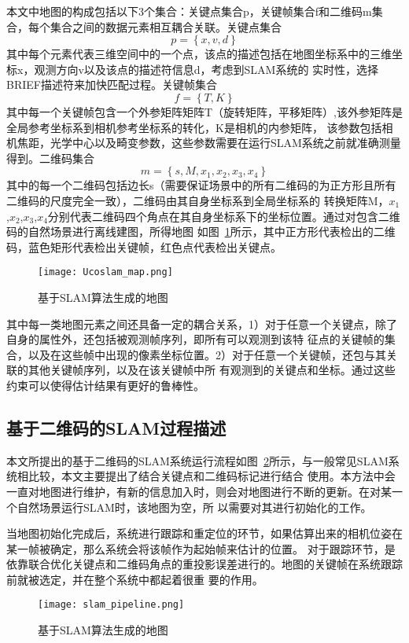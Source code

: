 本文中地图的构成包括以下3个集合：关键点集合p，关键帧集合f和二维码m集合，每个集合之间的数据元素相互耦合关联。关键点集合
\begin{equation}p = \left\{x,v,d\right\}\end{equation}
其中每个元素代表三维空间中的一个点，该点的描述包括在地图坐标系中的三维坐标x，观测方向v以及该点的描述符信息d，考虑到SLAM系统的
实时性，选择BRIEF描述符来加快匹配过程。关键帧集合
\begin{equation}f = \left\{T,K\right\}\end{equation}
其中每一个关键帧包含一个外参矩阵矩阵T（旋转矩阵，平移矩阵）,该外参矩阵是全局参考坐标系到相机参考坐标系的转化，K是相机的内参矩阵，
该参数包括相机焦距，光学中心以及畸变参数，这些参数需要在运行SLAM系统之前就准确测量得到。二维码集合
\begin{equation}m = \left\{s,M,x_1,x_2,x_3,x_4\right\}\end{equation}
其中的每一个二维码包括边长s（需要保证场景中的所有二维码的为正方形且所有二维码的尺度完全一致），二维码由其自身坐标系到全局坐标系的
转换矩阵M，$x_1$,$x_2$,$x_3$,$x_4$分别代表二维码四个角点在其自身坐标系下的坐标位置。通过对包含二维码的自然场景进行离线建图，所得地图
如图~\ref{fig:Ucoslam_map}所示，其中正方形代表检出的二维码，蓝色矩形代表检出关键帧，红色点代表检出关键点。
\begin{figure}[H] %
  \centering
  \texttt{[image: Ucoslam\_map.png]}
  \caption{基于SLAM算法生成的地图}
  \label{fig:Ucoslam_map}
\end{figure}

其中每一类地图元素之间还具备一定的耦合关系，1）对于任意一个关键点，除了自身的属性外，还包括被观测帧序列，即所有可以观测到该特
征点的关键帧的集合，以及在这些帧中出现的像素坐标位置。2）对于任意一个关键帧，还包与其关联的其他关键帧序列，以及在该关键帧中所
有观测到的关键点和坐标。通过这些约束可以使得估计结果有更好的鲁棒性。

\subsection{基于二维码的SLAM过程描述}
\label{sec:2.3.3}
本文所提出的基于二维码的SLAM系统运行流程如图~\ref{fig:slam_pipeline}所示，与一般常见SLAM系统相比较，本文主要提出了结合关键点和二维码标记进行结合
使用。本方法中会一直对地图进行维护，有新的信息加入时，则会对地图进行不断的更新。在对某一个自然场景运行SLAM时，该地图为空，所
以需要对其进行初始化的工作。

当地图初始化完成后，系统进行跟踪和重定位的环节，如果估算出来的相机位姿在某一帧被确定，那么系统会将该帧作为起始帧来估计的位置。
对于跟踪环节，是依靠联合优化关键点和二维码角点的重投影误差进行的。地图的关键帧在系统跟踪前就被选定，并在整个系统中都起着很重
要的作用。
\begin{figure}[H] %
  \centering
  \texttt{[image: slam\_pipeline.png]}
  \caption{基于SLAM算法生成的地图}
  \label{fig:slam_pipeline}
\end{figure}

